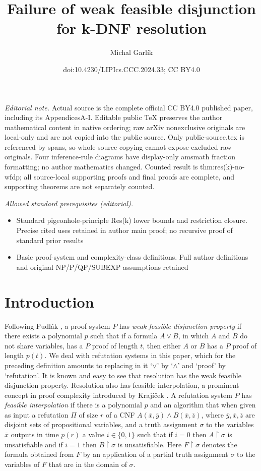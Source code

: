\documentclass[10pt,a4paper]{article}
\title{Failure of weak feasible disjunction for k-DNF resolution}
\author{Michal Garlík}
\date{doi:10.4230/LIPIcs.CCC.2024.33; CC BY4.0}
\theoremstyle{remark}
\newtheorem*{switching lemma}{Switching Lemma}
\newtheorem*{open problem}{Open Problem}
\theoremstyle{definition}
\begin{document}
\maketitle
\noindent\textit{Editorial note.} Actual source is the complete official CC BY4.0 published paper, including its AppendicesA-I. Editable public TeX preserves the author mathematical content in native ordering; raw arXiv nonexclusive originals are local-only and are not copied into the public source. Only public-source.tex is referenced by spans, so whole-source copying cannot expose excluded raw originals. Four inference-rule diagrams have display-only amsmath fraction formatting; no author mathematics changed. Counted result is thm:res(k)-no-wfdp; all source-local supporting proofs and final proofs are complete, and supporting theorems are not separately counted.\par\medskip
\noindent\textit{Allowed standard prerequisites (editorial).}\begin{itemize}
\item Standard pigeonhole-principle Res(k) lower bounds and restriction closure. Precise cited uses retained in author main proof; no recursive proof of standard prior results
\item Basic proof-system and complexity-class definitions. Full author definitions and original NP/P/QP/SUBEXP assumptions retained
\end{itemize}\medskip
\section{Introduction}

Following Pudl\'ak \cite{Pudlak2003}, a proof system $P$ has \emph{weak feasible disjunction property} if there exists a polynomial $p$ such that if a formula $A \lor B$, in which $A$ and $B$ do not share variables, has a $P$ proof of length $t$, then either $A$ or $B$ has a $P$ proof of length $p(t)$. We deal with refutation systems in this paper, which for the preceding definition amounts to replacing in it `$\lor$' by `$\land$' and `proof' by `refutation'. It is known and easy to see that resolution has the weak feasible disjunction property. Resolution also has feasible interpolation, a prominent concept in proof complexity introduced by Kraj\'{i}\v{c}ek \cite{Krajicek1994, Krajicek1997}. A refutation system $P$ has \emph{feasible interpolation} if there is a polynomial $p$ and an algorithm that when given as input a refutation $\Pi$ of size $r$ of a CNF $A(\overline{x}, \overline{y}) \land B(\overline{x}, \overline{z})$, where $\overline{y}, \overline{x}, \overline{z}$ are disjoint sets of propositional variables, and a truth assignment $\sigma$ to the variables $\overline{x}$ outputs in time $p(r)$ a value $i \in \{0,1\}$ such that if $i=0$ then $A \! \restriction \! \sigma$ is unsatisfiable and if $i=1$ then $B \! \restriction \! \sigma$ is unsatisfiable. Here $F \! \restriction \! \sigma$ denotes the formula obtained from $F$ by an application of a partial truth assignment $\sigma$ to the variables of $F$ that are in the domain of $\sigma$.
\end{document}
